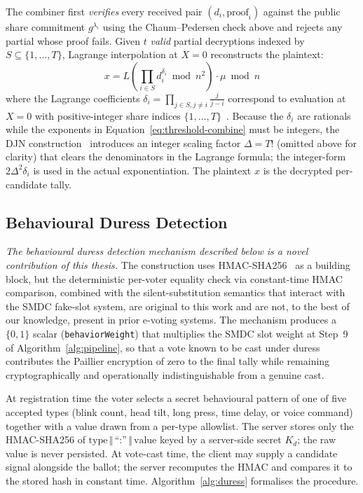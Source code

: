 The combiner first \emph{verifies} every received pair $(d_i, \text{proof}_i)$ against the public share commitment $g^{\lambda_i}$ using the Chaum--Pedersen check above and rejects any partial whose proof fails. Given $t$ \emph{valid} partial decryptions indexed by $S \subseteq \{1, \ldots, T\}$, Lagrange interpolation at $X = 0$ reconstructs the plaintext:
\begin{equation}
    x = L\!\left(\prod_{i \in S} d_i^{\delta_i} \bmod n^2\right) \cdot \mu \bmod n
    \label{eq:threshold-combine}
\end{equation}
where the Lagrange coefficients $\delta_i = \prod_{j \in S, j \neq i} \tfrac{j}{j - i}$ correspond to evaluation at $X = 0$ with positive-integer share indices $\{1, \ldots, T\}$~\cite{shamir1979}. Because the $\delta_i$ are rationals while the exponents in Equation~\eqref{eq:threshold-combine} must be integers, the DJN construction~\cite{damgard2010} introduces an integer scaling factor $\Delta = T!$ (omitted above for clarity) that clears the denominators in the Lagrange formula; the integer-form $2\Delta^2 \delta_i$ is used in the actual exponentiation. The plaintext $x$ is the decrypted per-candidate tally.

\subsection{Behavioural Duress Detection}
\label{subsec:duress-detection}

\emph{The behavioural duress detection mechanism described below is a novel contribution of this thesis.} The construction uses HMAC-SHA256~\cite{rfc2104,nist_fips198,nist_fips202} as a building block, but the deterministic per-voter equality check via constant-time HMAC comparison, combined with the silent-substitution semantics that interact with the SMDC fake-slot system, are original to this work and are not, to the best of our knowledge, present in prior e-voting systems. The mechanism produces a $\{0, 1\}$ scalar (\texttt{behaviorWeight}) that multiplies the SMDC slot weight at Step~9 of Algorithm~\ref{alg:pipeline}, so that a vote known to be cast under duress contributes the Paillier encryption of zero to the final tally while remaining cryptographically and operationally indistinguishable from a genuine cast.

At registration time the voter selects a secret behavioural pattern of one of five accepted types (blink count, head tilt, long press, time delay, or voice command) together with a value drawn from a per-type allowlist. The server stores only the HMAC-SHA256 of $\text{type}\,\Vert\,\text{``:''}\,\Vert\,\text{value}$ keyed by a server-side secret $K_d$; the raw value is never persisted. At vote-cast time, the client may supply a candidate signal alongside the ballot; the server recomputes the HMAC and compares it to the stored hash in constant time. Algorithm~\ref{alg:duress} formalises the procedure.


